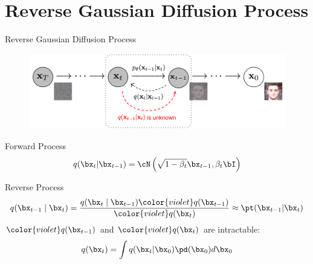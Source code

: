 \documentclass{beamer}
\begin{document}
\section{Reverse Gaussian Diffusion Process}
\begin{frame}{Reverse Gaussian Diffusion Process}
	\begin{figure}
		\includegraphics[width=0.8\linewidth]{figs/DDPM}
	\end{figure}
    \eqpause
	\vspace{-0.5cm}
	\begin{block}{Forward Process}
		\vspace{-0.3cm}
		\[
			q(\bx_t | \bx_{t-1}) = \cN\left(\sqrt{1 - \beta_t} \bx_{t-1}, \beta_t \bI\right)
		\]
		\vspace{-0.5cm}
	\end{block}
    \eqpause
	\begin{block}{Reverse Process}
		\vspace{-0.3cm}
		\[
			q(\bx_{t-1}\mid\bx_{t}) = \frac{q(\bx_{t}\mid\bx_{t-1}) {\color{violet}q(\bx_{t-1})}}{{\color{violet}q(\bx_{t})}} 
			\approx \pt(\bx_{t - 1} | \bx_t)
		\]
        \eqpause
		\vspace{-0.3cm}
		${\color{violet}q(\bx_{t-1})}$ and ${\color{violet}q(\bx_{t})}$ are intractable:
		\[
			q(\bx_{t}) = \int q(\bx_{t} | \bx_0) \pd(\bx_0) d\bx_0
		\]
	\end{block}
\end{frame}
\end{document}
